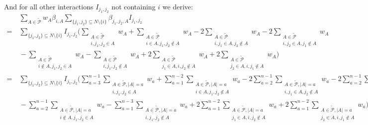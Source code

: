 And for all other interactions $I_{j_1,j_2}$ not containing $i$ we derive:
\begin{equation} \label{eq:pairs_i_excluded}
	\begin{array}{rll}
		& \ \sum\limits_{A \in \tilde{\mathcal{P}}} w_A \beta_{i,A} \sum\limits_{\{j_1,j_2\} \subseteq N \setminus \{i\}} \beta_{j_1,j_2,A} I_{j_1,j_2} \\
        = & \ \sum\limits_{\{j_1,j_2\} \subseteq N \setminus \{i\}} I_{j_1,j_2} \Bigg( \sum\limits_{\substack{A \in \tilde{\mathcal{P}} \\ i,j_1,j_2 \in A}} w_A + \sum\limits_{\substack{A \in \tilde{\mathcal{P}} \\ i \in A, j_1,j_2 \notin A}} w_A - 2\sum\limits_{\substack{A \in \tilde{\mathcal{P}} \\ i,j_1 \in A, j_2 \notin A}} w_A - 2\sum\limits_{\substack{A \in \tilde{\mathcal{P}} \\ i,j_2 \in A, j_1 \notin A}} w_A \\
        & \ - \sum\limits_{\substack{A \in \tilde{\mathcal{P}} \\ i \notin A, j_1,j_2 \in A}} w_A - \sum\limits_{\substack{A \in \tilde{\mathcal{P}} \\ i,j_1,j_2 \notin A}} w_A + 2\sum\limits_{\substack{A \in \tilde{\mathcal{P}} \\ j_1 \in A, i,j_2 \notin A}} w_A + 2\sum\limits_{\substack{A \in \tilde{\mathcal{P}} \\ j_2 \in A, i,j_1 \notin A}} w_A \Bigg) \\
        = & \ \sum\limits_{\{j_1,j_2\} \subseteq N \setminus \{i\}} I_{j_1,j_2} \Bigg( \sum\limits_{a=3}^{n-1} \sum\limits_{\substack{A \in \tilde{\mathcal{P}}, |A|=a \\ i,j_1,j_2 \in A}} w_a + \sum\limits_{a=1}^{n-2} \sum\limits_{\substack{A \in \tilde{\mathcal{P}}, |A|=a \\ i \in A, j_1,j_2 \notin A}} w_a - 2\sum\limits_{a=2}^{n-1} \sum\limits_{\substack{A \in \tilde{\mathcal{P}}, |A|=a \\ i,j_1 \in A, j_2 \notin A}} w_a - 2\sum\limits_{a=2}^{n-1} \sum\limits_{\substack{A \in \tilde{\mathcal{P}}, |A|=a \\ i,j_2 \in A, j_1 \notin A}} w_a \\
        & \ - \sum\limits_{a=2}^{n-1} \sum\limits_{\substack{A \in \tilde{\mathcal{P}}, |A|=a \\ i \notin A, j_1,j_2 \in A}} w_a - \sum\limits_{a=1}^{n-3} \sum\limits_{\substack{A \in \tilde{\mathcal{P}}, |A|=a \\ i,j_1,j_2 \notin A}} w_a + 2\sum\limits_{a=1}^{n-2} \sum\limits_{\substack{A \in \tilde{\mathcal{P}}, |A|=a \\ j_1 \in A, i,j_2 \notin A}} w_a + 2\sum\limits_{a=1}^{n-2} \sum\limits_{\substack{A \in \tilde{\mathcal{P}}, |A|=a \\ j_2 \in A, i,j_1 \notin A}} w_a \Bigg) \\

\end{array}
\end{equation}
